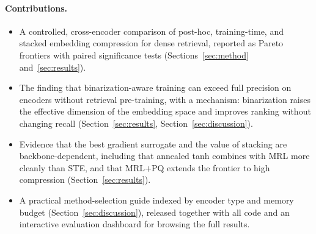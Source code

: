 \paragraph{Contributions.}
\begin{itemize}
  \item A controlled, cross-encoder comparison of post-hoc, training-time, and
        stacked embedding compression for dense retrieval, reported as Pareto
        frontiers with paired significance tests
        (Sections~\ref{sec:method} and~\ref{sec:results}).
  \item The finding that binarization-aware training can exceed full precision
        on encoders without retrieval pre-training, with a mechanism:
        binarization raises the effective dimension of the embedding space and
        improves ranking without changing recall
        (Section~\ref{sec:results}, Section~\ref{sec:discussion}).
  \item Evidence that the best gradient surrogate and the value of stacking are
        backbone-dependent, including that annealed tanh combines with MRL more
        cleanly than STE, and that MRL$+$PQ extends the frontier to high
        compression (Section~\ref{sec:results}).
  \item A practical method-selection guide indexed by encoder type and memory
        budget (Section~\ref{sec:discussion}), released together with all code
        and an interactive evaluation dashboard for browsing the full results.

\end{itemize}
